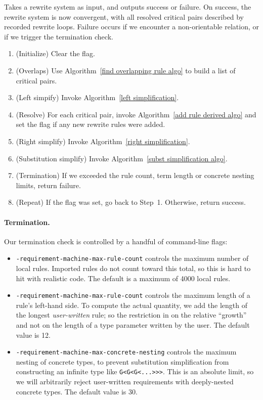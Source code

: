 \documentclass[../generics]{subfiles}
\begin{document}
\begin{algorithm}\label{knuthbendix} Takes a rewrite system as input, and outputs success or failure. On success, the rewrite system is now convergent, with all resolved critical pairs described by recorded rewrite loops. Failure occurs if we encounter a non-orientable relation, or if we trigger the termination check.
\begin{enumerate}
\item (Initialize) Clear the flag.
\item (Overlaps) Use Algorithm~\ref{find overlapping rule algo} to build a list of critical pairs.
\item (Left simpify) Invoke Algorithm~\ref{left simplification}.
\item (Resolve) For each critical pair, invoke Algorithm~\ref{add rule derived algo} and set the flag if any new rewrite rules were added.
\item (Right simplify) Invoke Algorithm~\ref{right simplification}.
\item (Substitution simplify) Invoke Algorithm~\ref{subst simplification algo}.
\item (Termination) If we exceeded the rule count, term length or concrete nesting limits, return failure.
\item (Repeat) If the flag was set, go back to Step~1. Otherwise, return success.
\end{enumerate}
\end{algorithm}

\paragraph{Termination.} Our termination check is controlled by a handful of command-line flags:
\begin{itemize}
\item {} \texttt{-requirement-machine-max-rule-count} controls the maximum number of local rules. Imported rules do not count toward this total, so this is hard to hit with realistic code. The default is a maximum of 4000 local rules.

\item {} \texttt{-requirement-machine-max-rule-count} controls the maximum length of a rule's left-hand side. To compute the actual quantity, we add the length of the longest \emph{user-written} rule; so the restriction in on the relative ``growth'' and not on the length of a type parameter written by the user. The default value is 12.

\item {} \texttt{-requirement-machine-max-concrete-nesting} controls the maximum nesting of concrete types, to prevent substitution simplification from constructing an infinite type like \texttt{G<G<G<...>>>}. This is an absolute limit, so we will arbitrarily reject user-written requirements with deeply-nested concrete types. The default value is 30.
\end{itemize}
\end{document}
